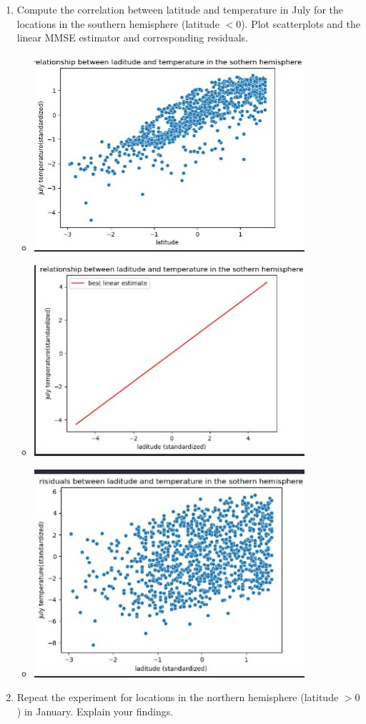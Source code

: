 \documentclass[12pt,twoside]{article}
\begin{document}
\begin{enumerate}
\begin{enumerate}
\begin{itemize}
    \end{itemize}
	\item Compute the correlation between latitude and temperature in July for the locations in the southern hemisphere (latitude $< 0$). Plot scatterplots and the linear MMSE estimator and corresponding residuals.

 \begin{itemize}
     \item  \includegraphics[width=10cm]{homework/homework_1/north_1.jpg}
 \item  \includegraphics[width=10cm]{homework/homework_1/north_2.jpg}
 \item  \includegraphics[width=10cm]{homework/homework_1/north_3.jpg}
 \end{itemize}
	\item Repeat the experiment for locations in the northern hemisphere (latitude $> 0$) in January. Explain your findings.


\end{enumerate}
\end{enumerate}
\end{document}
